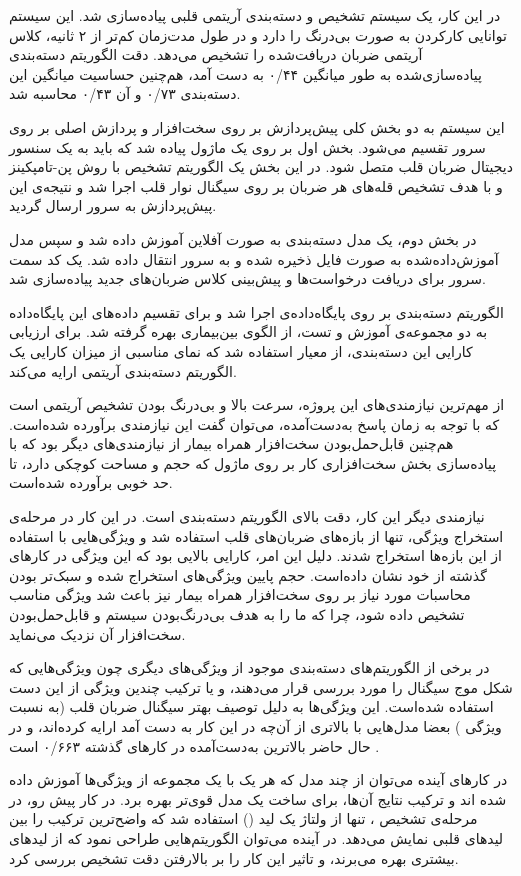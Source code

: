  
\label{chap:conclusion}
\pagebreak
در این کار، یک سیستم تشخیص و دسته‌بندی آریتمی قلبی پیاده‌سازی شد. این سیستم توانایی کارکردن به صورت بی‌درنگ را دارد و در طول مدت‌زمان کم‌تر از ۲ ثانیه، کلاس آریتمی ضربان دریافت‌شده را تشخیص می‌دهد. دقت الگوریتم دسته‌بندی پیاده‌سازی‌شده به طور میانگین ۰/۴۴ به دست آمد، هم‌چنین حساسیت میانگین این دسته‌بندی ۰/۷۳ و   آن ۰/۴۳ محاسبه شد. 

این سیستم به دو بخش کلی پیش‌پردازش بر روی سخت‌افزار و پردازش اصلی بر روی سرور تقسیم می‌شود. بخش اول بر روی یک ماژول  پیاده شد که باید به یک سنسور دیجیتال ضربان قلب متصل شود. در این بخش یک الگوریتم تشخیص  با روش پن-تامپکینز و با هدف تشخیص قله‌های  هر ضربان بر روی سیگنال نوار قلب اجرا شد و نتیجه‌ی این پیش‌پردازش به سرور ارسال گردید.

در بخش دوم، یک مدل دسته‌بندی  به صورت آفلاین آموزش داده شد و سپس مدل آموزش‌داده‌شده به صورت فایل ذخیره شده و به سرور انتقال داده شد. یک کد سمت سرور برای دریافت درخواست‌ها و پیش‌بینی کلاس ضربان‌‌های جدید پیاده‌سازی شد.

الگوریتم دسته‌بندی بر روی پایگاه‌داده‌ی  اجرا شد و برای تقسیم داده‌های این پایگاه‌داده به دو مجموعه‌ی آموزش و تست، از الگوی بین‌بیماری بهره گرفته شد. برای ارزیابی کارایی این دسته‌بندی، از معیار   استفاده شد که نمای مناسبی از میزان کارایی یک الگوریتم دسته‌بندی آریتمی ارایه می‌کند.

از مهم‌ترین نیازمندی‌های این پروژه، سرعت بالا و بی‌درنگ بودن تشخیص آریتمی است که با توجه به زمان پاسخ به‌دست‌آمده، می‌توان گفت این نیازمندی برآورده شده‌است. هم‌چنین قابل‌حمل‌بودن سخت‌افزار همراه بیمار  از نیازمندی‌های دیگر بود که با پیاده‌سازی بخش سخت‌افزاری کار بر روی ماژول  که حجم و مساحت کوچکی دارد، تا حد خوبی برآورده شده‌است.

نیازمندی دیگر این کار، دقت بالای الگوریتم دسته‌بندی است. در این کار در مرحله‌ی استخراج ویژگی، تنها از بازه‌های  ضربان‌های قلب استفاده شد و ویژگی‌هایی با استفاده از این بازه‌ها استخراج شدند. دلیل این امر، کارایی بالایی بود که این ویژگی‌ در کارهای گذشته از خود نشان داده‌است. حجم پایین ویژگی‌های استخراج شده و سبک‌تر بودن محاسبات مورد نیاز بر روی سخت‌افزار همراه بیمار  نیز باعث شد ویژگی  مناسب تشخیص داده شود، چرا که ما را به هدف بی‌درنگ‌بودن سیستم و قابل‌حمل‌بودن سخت‌افزار آن نزدیک می‌نماید.

در برخی از الگوریتم‌های دسته‌بندی موجود از ویژگی‌های دیگری چون ویژگی‌هایی که شکل موج سیگنال را مورد بررسی قرار می‌دهند، و یا ترکیب چندین ویژگی از این دست استفاده شده‌است. این ویژگی‌ها به دلیل توصیف بهتر سیگنال ضربان قلب (به نسبت ویژگی ) بعضا مدل‌هایی با   بالاتری از آن‌چه در این کار به دست آمد ارایه کرده‌اند، و در حال حاضر بالاترین   به‌دست‌آمده در کارهای گذشته ۰/۶۶۳ است \cite{Zhang2014}.

در کارهای آینده می‌توان از چند مدل  که هر یک با یک مجموعه از ویژگی‌ها آموزش داده شده اند و ترکیب نتایج آن‌ها، برای ساخت یک مدل  قوی‌تر بهره برد. در کار پیش رو، در مرحله‌ی تشخیص ، تنها از ولتاژ یک لید () استفاده شد که واضح‌ترین ترکیب  را بین لیدهای قلبی نمایش می‌دهد. در آینده می‌توان الگوریتم‌هایی طراحی نمود که از  لیدهای بیشتری بهره می‌برند، و تاثیر این کار را بر بالارفتن دقت تشخیص  بررسی کرد.
